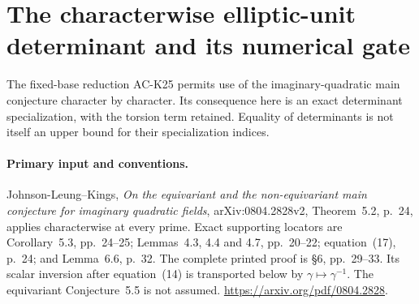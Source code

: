 \section{The characterwise elliptic-unit determinant and its numerical gate}
\label{sec:elliptic-unit-specialization}

The fixed-base reduction AC-K25 permits use of the
imaginary-quadratic main conjecture character by
character.  Its consequence here is an exact
determinant specialization, with the torsion term
retained.  Equality of determinants is not itself
an upper bound for their specialization indices.

\paragraph{Primary input and conventions.}
Johnson-Leung--Kings, \emph{On the equivariant and the
non-equivariant main conjecture for imaginary quadratic
fields}, arXiv:0804.2828v2, Theorem~5.2, p.~24, applies
characterwise at every prime.  Exact supporting locators
are Corollary~5.3, pp.~24--25; Lemmas~4.3, 4.4 and 4.7,
pp.~20--22; equation~(17), p.~24; and Lemma~6.6, p.~32.
The complete printed proof is \S6, pp.~29--33.
Its scalar inversion after equation~(14) is transported
below by $\gamma\mapsto\gamma^{-1}$.
The equivariant Conjecture~5.5 is not assumed.
\url{https://arxiv.org/pdf/0804.2828}.

